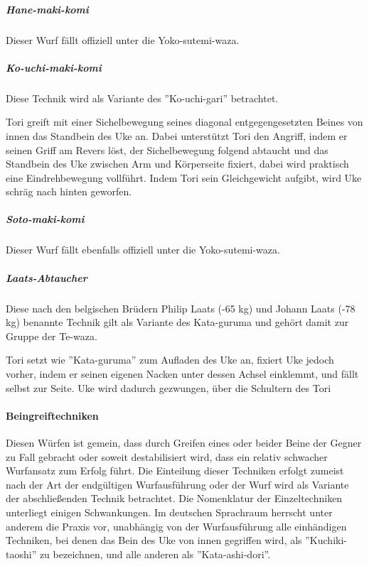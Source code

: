 \documentclass[justified, a4paper, notitlepage, captions=tableheading, nobib]{tufte-handout}
\begin{document}
\subparagraph{Hane-maki-komi}
\label{sec:orgc851cd7}

Dieser Wurf fällt offiziell unter die Yoko-sutemi-waza.

\subparagraph{Ko-uchi-maki-komi}
\label{sec:orgb4a3edc}

Diese Technik wird als Variante des ''Ko-uchi-gari'' betrachtet.

Tori greift mit einer Sichelbewegung seines diagonal entgegengesetzten Beines von innen das Standbein des Uke an. Dabei unterstützt Tori den Angriff, indem er seinen Griff am Revers löst, der Sichelbewegung folgend abtaucht und das Standbein des Uke zwischen Arm und Körperseite fixiert, dabei wird praktisch eine Eindrehbewegung vollführt. Indem Tori sein Gleichgewicht aufgibt, wird Uke schräg nach hinten geworfen.

\subparagraph{Soto-maki-komi}
\label{sec:org0f03313}

Dieser Wurf fällt ebenfalls offiziell unter die Yoko-sutemi-waza.

\subparagraph{Laats-Abtaucher}
\label{sec:org0fb3c76}

Diese nach den belgischen Brüdern Philip Laats (-65 kg) und Johann Laats (-78 kg) benannte Technik gilt als Variante des Kata-guruma und gehört damit zur Gruppe der Te-waza.

Tori setzt wie ''Kata-guruma'' zum Aufladen des Uke an, fixiert Uke jedoch vorher, indem er seinen eigenen Nacken unter dessen Achsel einklemmt, und fällt selbst zur Seite. Uke wird dadurch gezwungen, über die Schultern des Tori 

\paragraph{Beingreiftechniken }
\label{sec:org66530ab}

Diesen Würfen ist gemein, dass durch Greifen eines oder beider Beine der Gegner zu Fall gebracht oder soweit destabilisiert wird, dass ein relativ schwacher Wurfansatz zum Erfolg führt. Die Einteilung dieser Techniken erfolgt zumeist nach der Art der endgültigen Wurfausführung oder der Wurf wird als Variante der abschließenden Technik betrachtet. Die Nomenklatur der Einzeltechniken unterliegt einigen Schwankungen. Im deutschen Sprachraum herrscht unter anderem die Praxis vor, unabhängig von der Wurfausführung alle einhändigen Techniken, bei denen das Bein des Uke von innen gegriffen wird, als ''Kuchiki-taoshi'' zu bezeichnen, und alle anderen als ''Kata-ashi-dori''.
\end{document}
